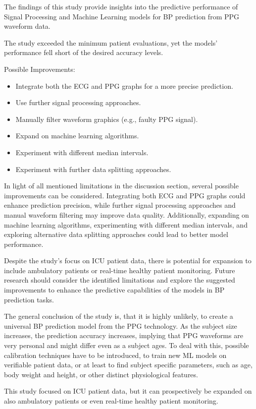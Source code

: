 The findings of this study provide insights into the predictive performance of Signal Processing and Machine Learning models for BP prediction from PPG waveform data.

The study exceeded the minimum patient evaluations, yet the models' performance fell short of the desired accuracy levels.


Possible Improvements:
\begin{itemize}
    \item Integrate both the ECG and PPG graphs for a more precise prediction.
    \item Use further signal processing approaches.
    \item Manually filter waveform graphics (e.g., faulty PPG signal).
    \item Expand on machine learning algorithms.
    \item Experiment with different median intervals.
    \item Experiment with further data splitting approaches.
\end{itemize}

In light of all mentioned limitations in the discussion section, several possible improvements can be considered.
Integrating both ECG and PPG graphs could enhance prediction precision, while further signal processing approaches and manual waveform filtering may improve data quality.
Additionally, expanding on machine learning algorithms, experimenting with different median intervals, and exploring alternative data splitting approaches could lead to better model performance.

Despite the study's focus on ICU patient data, there is potential for expansion to include ambulatory patients or real-time healthy patient monitoring.
Future research should consider the identified limitations and explore the suggested improvements to enhance the predictive capabilities of the models in BP prediction tasks.

The general conclusion of the study is, that it is highly unlikely, to create a universal BP prediction model from the PPG technology.
As the subject size increases, the prediction accuracy increases, implying that PPG waveforms are very personal and might differ even as a subject ages.
To deal with this, possible calibration techniques have to be introduced, to train new ML models on verifiable patient data, or at least to find subject specific parameters,
such as age, body weight and height, or other distinct physiological features.

This study focused on ICU patient data, but it can prospectively be expanded on also ambulatory patients or even real-time healthy patient monitoring.
